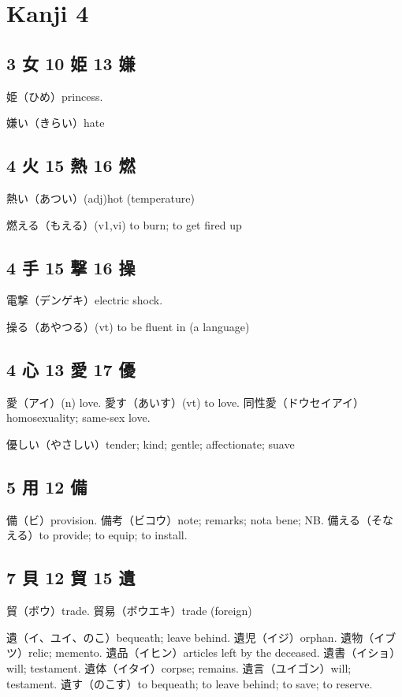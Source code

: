 \chapter{Kanji 4}

\section{3 女 10 姫 13 嫌}

姫（ひめ）princess.

嫌い（きらい）hate

\section{4 火 15 熱 16 燃}

熱い（あつい）(adj)hot (temperature)

燃える（もえる）(v1,vi) to burn; to get fired up

\section{4 手 15 撃 16 操}

電撃（デンゲキ）electric shock.

操る（あやつる）(vt) to be fluent in (a language)

\section{4 心 13 愛 17 優}

愛（アイ）(n) love.
愛す（あいす）(vt) to love.
同性愛（ドウセイアイ）homosexuality; same-sex love.

優しい（やさしい）tender; kind; gentle; affectionate; suave

\section{5 用 12 備}

備（ビ）provision.
備考（ビコウ）note; remarks; nota bene; NB.
備える（そなえる）to provide; to equip; to install.

\section{7 貝 12 貿 15 遺}

貿（ボウ）trade.
貿易（ボウエキ）trade (foreign)

遺（イ、ユイ、のこ）bequeath; leave behind.
遺児（イジ）orphan.
遺物（イブツ）relic; memento.
遺品（イヒン）articles left by the deceased.
遺書（イショ）will; testament.
遺体（イタイ）corpse; remains.
遺言（ユイゴン）will; testament.
遺す（のこす）to bequeath; to leave behind; to save; to reserve.

